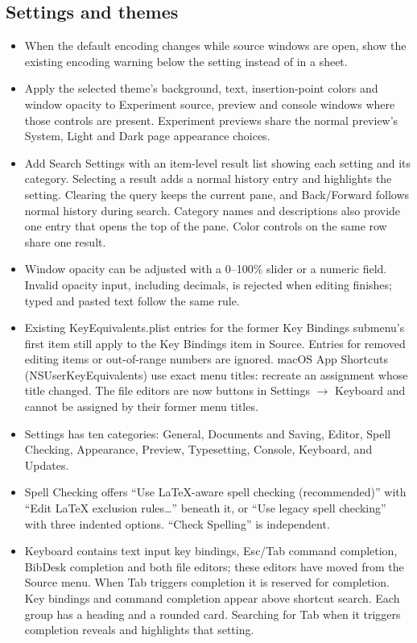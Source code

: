 \documentclass[11pt,letterpaper]{article}
\begin{document}
\subsection{Settings and themes}

\begin{itemize}
\item When the default encoding changes while source windows are open, show the existing encoding warning below the setting instead of in a sheet.
\end{itemize}

\begin{itemize}
\item Apply the selected theme’s background, text, insertion-point colors and window opacity to Experiment source, preview and console windows where those controls are present. Experiment previews share the normal preview’s System, Light and Dark page appearance choices.
\item Add Search Settings with an item-level result list showing each setting and its category. Selecting a result adds a normal history entry and highlights the setting. Clearing the query keeps the current pane, and Back/Forward follows normal history during search. Category names and descriptions also provide one entry that opens the top of the pane. Color controls on the same row share one result.
\item Window opacity can be adjusted with a 0–100\% slider or a numeric field. Invalid opacity input, including decimals, is rejected when editing finishes; typed and pasted text follow the same rule.
\item Existing KeyEquivalents.plist entries for the former Key Bindings submenu’s first item still apply to the Key Bindings item in Source. Entries for removed editing items or out-of-range numbers are ignored. macOS App Shortcuts (NSUserKeyEquivalents) use exact menu titles: recreate an assignment whose title changed. The file editors are now buttons in Settings \(\rightarrow\) Keyboard and cannot be assigned by their former menu titles.
\item Settings has ten categories: General, Documents and Saving, Editor, Spell Checking, Appearance, Preview, Typesetting, Console, Keyboard, and Updates.
\item Spell Checking offers “Use LaTeX-aware spell checking (recommended)” with “Edit LaTeX exclusion rules…” beneath it, or “Use legacy spell checking” with three indented options. “Check Spelling” is independent.
\item Keyboard contains text input key bindings, Esc/Tab command completion, BibDesk completion and both file editors; these editors have moved from the Source menu. When Tab triggers completion it is reserved for completion. Key bindings and command completion appear above shortcut search. Each group has a heading and a rounded card. Searching for Tab when it triggers completion reveals and highlights that setting.

\end{itemize}
\end{document}
